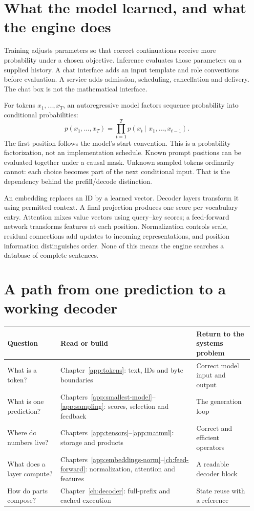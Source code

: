 \section*{What the model learned, and what the engine does}
Training adjusts parameters so that correct continuations receive more
probability under a chosen objective. Inference evaluates those parameters
on a supplied history. A chat interface adds an input template and role
conventions before evaluation. A service adds admission, scheduling,
cancellation and delivery. The chat box is not the mathematical interface.

For tokens $x_1,\ldots,x_T$, an autoregressive model factors sequence
probability into conditional probabilities:
\[
 p(x_1,\ldots,x_T)=\prod_{t=1}^{T}p(x_t\mid x_1,\ldots,x_{t-1}).
\]
The first position follows the model's start convention. This is a
probability factorization, not an implementation schedule. Known prompt
positions can be evaluated together under a causal mask. Unknown sampled
tokens ordinarily cannot: each choice becomes part of the next conditional
input. That is the dependency behind the prefill/decode distinction.

An embedding replaces an ID by a learned vector. Decoder layers transform
it using permitted context. A final projection produces one score per
vocabulary entry. Attention mixes value vectors using query--key scores;
a feed-forward network transforms features at each position. Normalization
controls scale, residual connections add updates to incoming representations,
and position information distinguishes order. None of this means the engine
searches a database of complete sentences.

\section*{A path from one prediction to a working decoder}
\begin{longtable}{@{}p{.20\linewidth}p{.34\linewidth}p{.38\linewidth}@{}}
\toprule Question & Read or build & Return to the systems problem\\\midrule
What is a token? & Chapter~\ref{app:tokens}: text, IDs and byte boundaries & Correct model input and output\\
What is one prediction? & Chapters~\ref{app:smallest-model}--\ref{app:sampling}: scores, selection and feedback & The generation loop\\
Where do numbers live? & Chapters~\ref{app:tensors}--\ref{app:matmul}: storage and products & Correct and efficient operators\\
What does a layer compute? & Chapters~\ref{app:embeddings-norm}--\ref{ch:feed-forward}: normalization, attention and features & A readable decoder block\\
How do parts compose? & Chapter~\ref{ch:decoder}: full-prefix and cached execution & State reuse with a reference\\
\bottomrule
\end{longtable}

